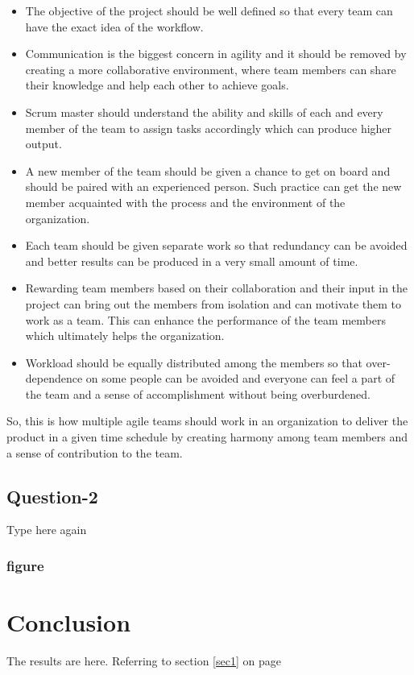 \documentclass[sigplan,screen]{acmart}
\begin{document}
\begin{itemize}
\item The objective of the project should be well defined so that every team can have the exact idea of the workflow. \cite{SAFe18}
\item Communication is the biggest concern in agility and it should be removed by creating a more collaborative environment, where team members can share their knowledge and help each other to achieve goals. \cite{Agile}
\item Scrum master should understand the ability and skills of each and every member of the team to assign tasks accordingly which can produce higher output.
\item A new member of the team should be given a chance to get on board and should be paired with an experienced person. Such practice can get the new member acquainted with the process and the environment of the organization.
\item Each team should be given separate work so that redundancy can be avoided and better results can be produced in a very small amount of time. \cite{GSA}
\item Rewarding team members based on their collaboration and their input in the project can bring out the members from isolation and can motivate them to work as a team. This can enhance the performance of the team members which ultimately helps the organization. 
\item Workload should be equally distributed among the members so that over-dependence on some people can be avoided and everyone can feel a part of the team and a sense of accomplishment without being overburdened.
\end{itemize}
So, this is how multiple agile teams should work in an organization to deliver the product in a given time schedule by creating harmony among team members and a sense of contribution to the team. \\


\subsection{Question-2}
Type here again

\subsubsection{figure}
	\begin{figure}[h]
	\end{figure}

\section{Conclusion}
The results are here. Referring to section \ref{sec1} on page \pageref{sec1}

\newpage



\end{document}
